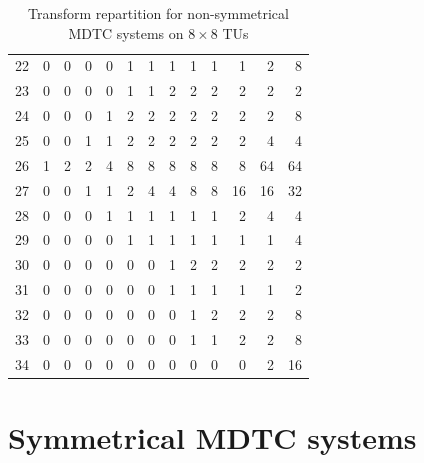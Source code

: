 \documentclass[11pt,a4paper,openright,twoside]{book}
\numberwithin{equation}{section} %
\numberwithin{figure}{section} %
\numberwithin{table}{section} %
\begin{document}
\begin{table}[h]
\begin{tabular}{c|rrrrrrrrrrrr}
		22 & 0 & 0 & 0 & 0 & 1 & 1  & 1  & 1  & 1  & 1   & 2   & 8 \\
		23 & 0 & 0 & 0 & 0 & 1 & 1  & 2  & 2  & 2  & 2   & 2   & 2 \\
		24 & 0 & 0 & 0 & 1 & 2 & 2  & 2  & 2  & 2  & 2   & 2   & 8 \\
		25 & 0 & 0 & 1 & 1 & 2 & 2  & 2  & 2  & 2  & 2   & 4   & 4 \\
		26 & 1 & 2 & 2 & 4 & 8 & 8  & 8  & 8  & 8  & 8   & 64  & 64 \\
		27 & 0 & 0 & 1 & 1 & 2 & 4  & 4  & 8  & 8  & 16  & 16  & 32 \\
		28 & 0 & 0 & 0 & 1 & 1 & 1  & 1  & 1  & 1  & 2   & 4   & 4 \\
		29 & 0 & 0 & 0 & 0 & 1 & 1  & 1  & 1  & 1  & 1   & 1   & 4 \\
		30 & 0 & 0 & 0 & 0 & 0 & 0  & 1  & 2  & 2  & 2   & 2   & 2 \\
		31 & 0 & 0 & 0 & 0 & 0 & 0  & 1  & 1  & 1  & 1   & 1   & 2 \\
		32 & 0 & 0 & 0 & 0 & 0 & 0  & 0  & 1  & 2  & 2   & 2   & 8 \\
		33 & 0 & 0 & 0 & 0 & 0 & 0  & 0  & 1  & 1  & 2   & 2   & 8 \\
		34 & 0 & 0 & 0 & 0 & 0 & 0  & 0  & 0  & 0  & 0   & 2   & 16 \\
	\end{tabular}
	\caption{Transform repartition for non-symmetrical \acs{MDTC} systems on
	$8\times8$ \acsp{TU}}
	\label{tab:config_nonsym_mdtc_8}
\end{table}

\clearpage

\section*{Symmetrical \acs{MDTC} systems}
\label{sec:symmetrical_mdtc_systems}
\end{document}
